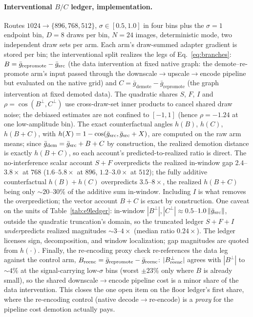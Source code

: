 \paragraph{Interventional $B/C$ ledger, implementation.} Routes
$1024{\to}\{896, 768, 512\}$, $\sigma \in [0.5, 1.0]$ in four bins plus
the $\sigma{=}1$ endpoint bin, $D{=}8$ draws per bin, $N{=}24$ images,
deterministic mode, two independent draw sets per arm. Each arm's
draw-summed adapter gradient is stored per bin; the interventional split
realizes the legs of Eq.~\ref{eq:branches}:
$B = \bar g_{\mathrm{repromote}} - \bar g_{\mathrm{src}}$ (the data
intervention at fixed native graph: the demote--re-promote arm's input
passed through the downscale$\to$upscale$\to$encode pipeline but
evaluated on the native grid) and
$C = \bar g_{\mathrm{demote}} - \bar g_{\mathrm{repromote}}$ (the graph
intervention at fixed demoted data). The quadratic shares $S$, $F$, $I$
and $\rho = \cos(B^{\perp}, C^{\perp})$ use cross-draw-set inner
products to cancel shared draw noise; the debiased estimates are not
confined to $[-1, 1]$ (hence $\rho = -1.24$ at one low-amplitude
bin).
The exact counterfactual angles $h(B)$, $h(C)$, $h(B{+}C)$, with
$h(X) = 1 - \cos(\bar g_{\mathrm{src}}, \bar g_{\mathrm{src}} + X)$, are computed on
the raw arm means; since $\bar g_{\mathrm{dem}} = \bar g_{\mathrm{src}} + B + C$ by
construction, the realized demotion distance is exactly $h(B{+}C)$, so
each account's predicted-to-realized ratio is direct. The
no-interference scalar account $S{+}F$ overpredicts the realized
in-window gap $2.4$--$3.8\times$ at $768$ ($1.6$--$5.8\times$ at $896$,
$1.2$--$3.0\times$ at $512$); the fully additive counterfactual
$h(B) + h(C)$ overpredicts $3.5$--$8\times$, the realized $h(B{+}C)$
being only ${\sim}20$--$30\%$ of the additive sum in-window. Including
$I$ is what removes the overprediction; the vector account $B{+}C$ is
exact by construction. One caveat on the units of
Table~\ref{tab:e9ledger}: in-window
$|B^{\perp}|, |C^{\perp}| \approx 0.5$--$1.0\,\|\bar g_{\mathrm{src}}\|$,
outside the quadratic truncation's domain, so the truncated ledger
$S{+}F{+}I$ \emph{under}predicts realized magnitudes ${\sim}3$--$4\times$
(median ratio $0.24\times$). The ledger licenses sign, decomposition,
and window localization; gap magnitudes are quoted from $h(\cdot)$.
Finally, the re-encoding proxy check re-references the data leg against
the control arm, $B_{\mathrm{reenc}} = \bar g_{\mathrm{repromote}} -
\bar g_{\mathrm{reenc}}$: $|B^{\perp}_{\mathrm{reenc}}|$ agrees with $|B^{\perp}|$ to
${\sim}4\%$ at the signal-carrying low-$\sigma$ bins (worst $\pm 23\%$
only where $B$ is already small), so the shared downscale$\to$encode
pipeline cost is a minor share of the data intervention. This closes
the one open item on the floor ledger's first share, where the
re-encoding control (native decode$\to$re-encode) is a \emph{proxy}
for the pipeline cost demotion actually pays.

